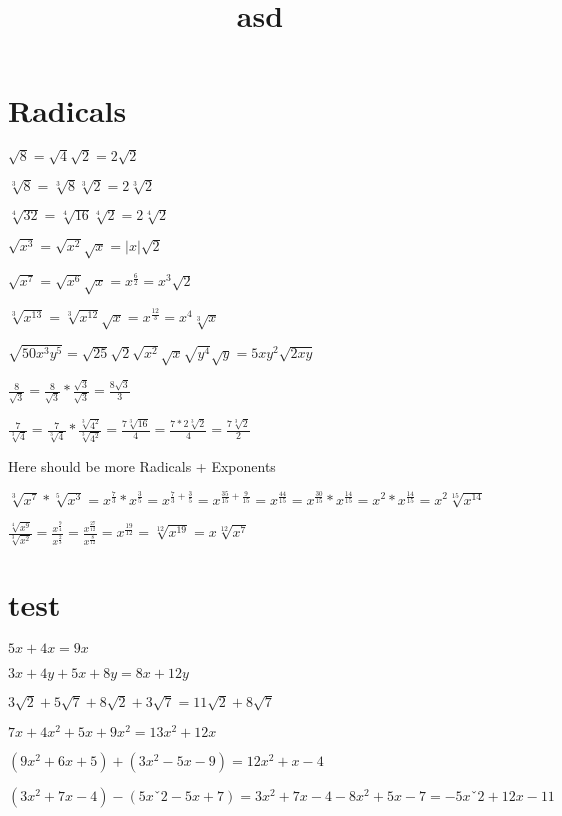 \documentclass[11pt,a4paper,leqno]{article}
\begin{document}
\noindent
\setlength\parindent{0pt}
\title{asd}

\section{Radicals}

$\sqrt{8} = \sqrt{4}\sqrt{2} = 2\sqrt{2}$

$\sqrt[3]{8} = \sqrt[3]{8}\sqrt[3]{2} = 2\sqrt[3]2$

$\sqrt[4]{32} = \sqrt[4]{16}\sqrt[4]{2} = 2\sqrt[4]2$

$\sqrt{x^3} = \sqrt{x^2}\sqrt{x} = |x|\sqrt{2}$

$\sqrt{x^7} = \sqrt{x^6}\sqrt{x} = x^{\frac{6}{2}} = x^3\sqrt{2}$

$\sqrt[3]{x^13} = \sqrt[3]{x^{12}}\sqrt{x} = x^{\frac{12}{3}} = x^4\sqrt[3]{x}$

$\sqrt{50x^3y^5} = \sqrt{25}\sqrt{2}\sqrt{x^2}\sqrt{x}\sqrt{y^4}\sqrt{y} = 5xy^2\sqrt{2xy}$

$\frac{8}{\sqrt{3}} = \frac{8}{\sqrt{3}} * \frac{\sqrt{3}}{\sqrt{3}} = \frac{8\sqrt{3}}{3}$

$\frac{7}{\sqrt[3]{4}} = \frac{7}{\sqrt[3]{4}} * \frac{\sqrt[3]{4^2}}{\sqrt[3]{4^2}} = \frac{7\sqrt[3]{16}}{4} = \frac{7 * 2\sqrt[3]{2}}{4} = \frac{7\sqrt[3]{2}}{2}$

Here should be more Radicals + Exponents

$\sqrt[3]{x^7} * \sqrt[5]{x^3} = x^{\frac{7}{3}} * x^{\frac{3}{5}} = x^{\frac{7}{3} + \frac{3}{5}} = x^{\frac{35}{15} + \frac{9}{15}} = x^{\frac{44}{15}} = x^{\frac{30}{15}} * x^{\frac{14}{15}} = x^2 * x^{\frac{14}{15}} = x^2\sqrt[15]{x^{14}}$

$\frac{\sqrt[4]{x^9}}{\sqrt[3]{x^2}} = \frac{x^{\frac{9}{4}}}{x^{\frac{2}{3}}} = \frac{x^{\frac{27}{12}}}{x^{\frac{8}{12}}} = x^{\frac{19}{12}} = \sqrt[12]{x^{19}} = x\sqrt[12]{x^7}
 $

\section{test}

$5x + 4x = 9x$

$3x + 4y + 5x + 8y = 8x + 12y$

$3\sqrt{2} + 5\sqrt{7} + 8\sqrt{2} + 3\sqrt{7} = 11\sqrt{2} + 8\sqrt{7}$

$7x + 4x^2 + 5x + 9x^2 = 13x^2 + 12x$

$(9x^2 + 6x + 5) + (3x^2 - 5x - 9) = 12x^2 + x - 4$

$(3x^2 + 7x - 4) - (5xˇ2 - 5x + 7) = 3x^2 + 7x - 4 -8x^2 + 5x - 7 = -5xˇ2 + 12x -11$ 
\end{document}
